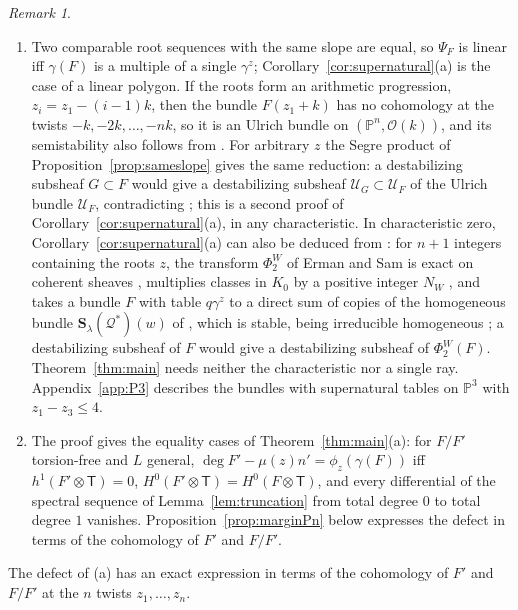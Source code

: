 \documentclass[11pt]{amsart}
\theoremstyle{definition}
\theoremstyle{remark}
\newtheorem{remark}[theorem]{Remark}
\newcommand{\PP}{\mathbb{P}}
\newcommand{\OO}{\mathcal{O}}
\newcommand{\cU}{\mathcal{U}}
\newcommand{\Tt}{\mathsf{T}}
\begin{document}
\begin{remark}
\begin{enumerate}[label=(\arabic*)]
\item Two comparable root sequences with the same slope are equal, so $\Psi_F$ is linear iff $\gamma(F)$ is a multiple of a single $\gamma^z$; Corollary~\ref{cor:supernatural}(a) is the case of a linear polygon. If the roots form an arithmetic progression, $z_i=z_1-(i-1)k$, then the bundle $F(z_1+k)$ has no cohomology at the twists $-k,-2k,\dots,-nk$, so it is an Ulrich bundle on $(\PP^n,\OO(k))$, and its semistability also follows from \cite[Thm.~2.9]{CH12}. For arbitrary $z$ the Segre product of Proposition~\ref{prop:sameslope} gives the same reduction: a destabilizing subsheaf $G\subset F$ would give a destabilizing subsheaf $\cU_G\subset\cU_F$ of the Ulrich bundle $\cU_F$, contradicting \cite[Thm.~2.9(a)]{CH12}; this is a second proof of Corollary~\ref{cor:supernatural}(a), in any characteristic. In characteristic zero, Corollary~\ref{cor:supernatural}(a) can also be deduced from \cite{ErSa16}: for $n+1$ integers containing the roots $z$, the transform $\Phi^W_2$ of Erman and Sam is exact on coherent sheaves \cite[Prop.~4.4]{ErSa16}, multiplies classes in $K_0$ by a positive integer $N_W$ \cite[Cor.~1.4]{ErSa16}, and takes a bundle $F$ with table $q\gamma^z$ to a direct sum of copies of the homogeneous bundle $\mathbf S_\lambda(\mathcal Q^*)(w)$ of \cite[(3.2), Cor.~1.9]{ErSa16}, which is stable, being irreducible homogeneous \cite{Ra66,Um78}; a destabilizing subsheaf of $F$ would give a destabilizing subsheaf of $\Phi^W_2(F)$. Theorem~\ref{thm:main} needs neither the characteristic nor a single ray. Appendix~\ref{app:P3} describes the bundles with supernatural tables on $\PP^3$ with $z_1-z_3\le4$.
\item The proof gives the equality cases of Theorem~\ref{thm:main}(a): for $F/F'$ torsion-free and $L$ general, $\deg F'-\mu(z)n'=\phi_z(\gamma(F))$ iff $h^1(F'\otimes \Tt)=0$, $H^0(F'\otimes \Tt)=H^0(F\otimes \Tt)$, and every differential of the spectral sequence of Lemma~\ref{lem:truncation} from total degree $0$ to total degree $1$ vanishes. Proposition~\ref{prop:marginPn} below expresses the defect in terms of the cohomology of $F'$ and $F/F'$.
\end{enumerate}
\end{remark}

The defect of (a) has an exact expression in terms of the cohomology of $F'$ and $F/F'$ at the $n$ twists $z_1,\dots,z_n$.
\end{document}
